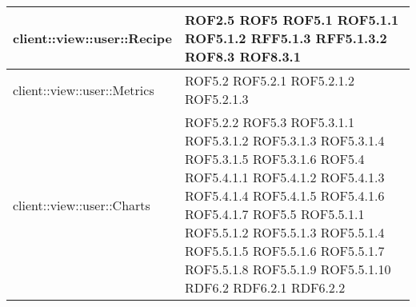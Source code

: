 \begin{center}
\begin{longtable}{| p{11cm} | p{2.5cm} |}
\hline
client::view::user::Recipe & ROF2.5 \newline ROF5 \newline ROF5.1 \newline ROF5.1.1 \newline ROF5.1.2 \newline RFF5.1.3 \newline RFF5.1.3.2 \newline ROF8.3 \newline ROF8.3.1 \\
\hline
client::view::user::Metrics & ROF5.2 \newline ROF5.2.1 \newline ROF5.2.1.2 \newline ROF5.2.1.3 \\
\hline
client::view::user::Charts & ROF5.2.2 \newline ROF5.3 \newline ROF5.3.1.1 \newline ROF5.3.1.2 \newline ROF5.3.1.3 \newline ROF5.3.1.4 \newline ROF5.3.1.5 \newline ROF5.3.1.6 \newline ROF5.4 \newline ROF5.4.1.1 \newline ROF5.4.1.2 \newline ROF5.4.1.3 \newline ROF5.4.1.4 \newline ROF5.4.1.5 \newline ROF5.4.1.6 \newline ROF5.4.1.7 \newline ROF5.5 \newline ROF5.5.1.1 \newline ROF5.5.1.2 \newline ROF5.5.1.3 \newline ROF5.5.1.4 \newline ROF5.5.1.5 \newline ROF5.5.1.6 \newline ROF5.5.1.7 \newline ROF5.5.1.8 \newline ROF5.5.1.9 \newline ROF5.5.1.10 \newline RDF6.2 \newline RDF6.2.1 \newline RDF6.2.2 \\

\end{longtable}
\end{center}
